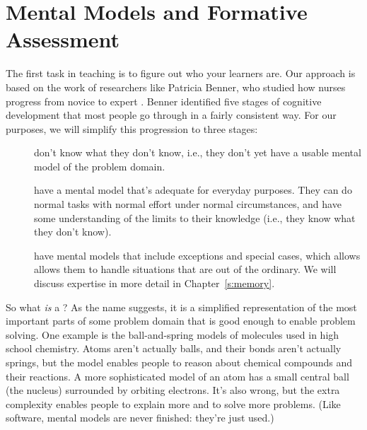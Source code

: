 \chapter{Mental Models and Formative Assessment}\label{s:models}

The first task in teaching is to figure out who your learners are.
Our approach is based on the work of researchers like Patricia Benner,
who studied how nurses progress from novice to expert \cite{Benn2000}.
Benner identified five stages of cognitive development that most people go through in a fairly consistent way.
For our purposes, we will simplify this progression to three stages:

\begin{description}

\item[]
  don't know what they don't know,
  i.e., they don't yet have a usable mental model of the problem domain.

\item[]
  have a mental model that's adequate for everyday purposes.
  They can do normal tasks with normal effort under normal circumstances,
  and have some understanding of the limits to their knowledge
  (i.e., they know what they don't know).

\item[]
  have mental models that include exceptions and special cases,
  which allows allows them to handle situations that are out of the ordinary.
  We will discuss expertise in more detail in Chapter~\ref{s:memory}.

\end{description}

So what \emph{is} a ?
As the name suggests,
it is a simplified representation of the most important parts of some problem domain
that is good enough to enable problem solving.
One example is the ball-and-spring models of molecules used in high school chemistry.
Atoms aren't actually balls,
and their bonds aren't actually springs,
but the model enables people to reason about chemical compounds and their reactions.
A more sophisticated model of an atom has a small central ball (the nucleus) surrounded by orbiting electrons.
It's also wrong,
but the extra complexity enables people to explain more and to solve more problems.
(Like software,
mental models are never finished:
they're just used.)

